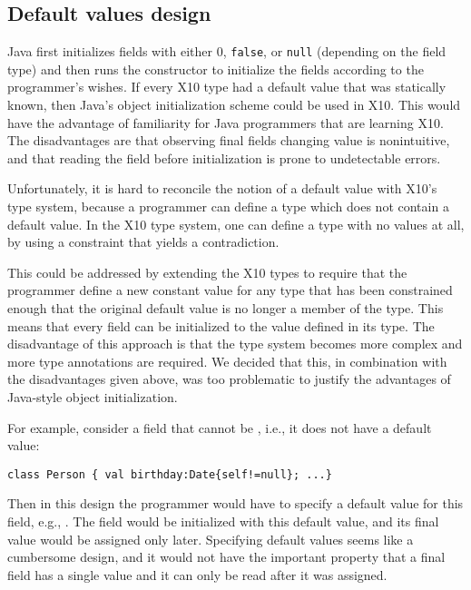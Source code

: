 

\subsection{Default values design}

Java first initializes fields with either $0$, \texttt{false}, or \texttt{null}
(depending on the field type) and then runs the constructor to initialize
the fields according to the programmer's wishes.  If every X10 type had a
default value that was statically known, then Java's object initialization
scheme could be used in X10.  This would have the advantage of familiarity for
Java programmers that are learning X10.  The disadvantages are that
observing final fields changing value is nonintuitive, and that reading the
field before initialization is prone to undetectable errors.

Unfortunately, it is hard to reconcile the notion of a default value with X10's
type system, because a programmer can define a type which does not contain a
default value.  In the X10 type system, one can define a type with no values at
all, by using a constraint that yields a contradiction.

This could be addressed by extending the X10 types to require that the
programmer define a new constant value for any type that has been constrained
enough that the original default value is no longer a member of the type.  This
means that every field can be initialized to the value defined in its type.  The
disadvantage of this approach is that the type system becomes more complex and more type
annotations are required.  We decided that this, in combination with the
disadvantages given above, was too problematic to justify the advantages of
Java-style object initialization.

For example, consider a field  that cannot be , i.e., it does not have a default value:
\vspace{-0.2cm}\begin{lstlisting}
class Person { val birthday:Date{self!=null}; ...}
\end{lstlisting}\vspace{-0.2cm}
Then in this design the programmer would have to specify a default value for this field,
    e.g., .
The field would be initialized with this default value, and its final value would be assigned only later.
Specifying default values seems like a cumbersome design,
    and it would not have the important property that a final field
        has a single value and it can only be read after it was assigned.

